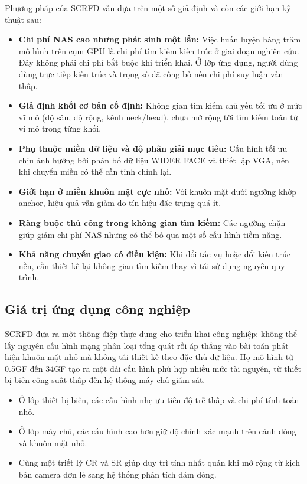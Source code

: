 Phương pháp của SCRFD vẫn dựa trên một số giả định và còn các giới hạn kỹ thuật sau:
\begin{itemize}
  \item \textbf{Chi phí NAS cao nhưng phát sinh một lần:} Việc huấn luyện hàng trăm mô hình trên cụm GPU là chi phí tìm kiếm kiến trúc ở giai đoạn nghiên cứu. Đây không phải chi phí bắt buộc khi triển khai. Ở lớp ứng dụng, người dùng dùng trực tiếp kiến trúc và trọng số đã công bố nên chi phí suy luận vẫn thấp.
  \item \textbf{Giả định khối cơ bản cố định:} Không gian tìm kiếm chủ yếu tối ưu ở mức vĩ mô (độ sâu, độ rộng, kênh neck/head), chưa mở rộng tới tìm kiếm toán tử vi mô trong từng khối.
  \item \textbf{Phụ thuộc miền dữ liệu và độ phân giải mục tiêu:} Cấu hình tối ưu chịu ảnh hưởng bởi phân bố dữ liệu WIDER FACE và thiết lập VGA, nên khi chuyển miền có thể cần tinh chỉnh lại.
  \item \textbf{Giới hạn ở miền khuôn mặt cực nhỏ:} Với khuôn mặt dưới ngưỡng khớp anchor, hiệu quả vẫn giảm do tín hiệu đặc trưng quá ít.
  \item \textbf{Ràng buộc thủ công trong không gian tìm kiếm:} Các ngưỡng chặn giúp giảm chi phí NAS nhưng có thể bỏ qua một số cấu hình tiềm năng.
  \item \textbf{Khả năng chuyển giao có điều kiện:} Khi đổi tác vụ hoặc đổi kiến trúc nền, cần thiết kế lại không gian tìm kiếm thay vì tái sử dụng nguyên quy trình.
\end{itemize}

\subsection{Giá trị ứng dụng công nghiệp}

SCRFD đưa ra một thông điệp thực dụng cho triển khai công nghiệp:
không thể lấy nguyên cấu hình mạng phân loại tổng quát rồi áp thẳng vào bài toán phát hiện khuôn mặt nhỏ mà không tái thiết kế theo đặc thù dữ liệu.
Họ mô hình từ 0.5GF đến 34GF tạo ra một dải cấu hình phù hợp nhiều mức tài nguyên, từ thiết bị biên công suất thấp đến hệ thống máy chủ giám sát.
\begin{itemize}
  \item Ở lớp thiết bị biên, các cấu hình nhẹ ưu tiên độ trễ thấp và chi phí tính toán nhỏ.
  \item Ở lớp máy chủ, các cấu hình cao hơn giữ độ chính xác mạnh trên cảnh đông và khuôn mặt nhỏ.
  \item Cùng một triết lý CR và SR giúp duy trì tính nhất quán khi mở rộng từ kịch bản camera đơn lẻ sang hệ thống phân tích đám đông.
\end{itemize}

